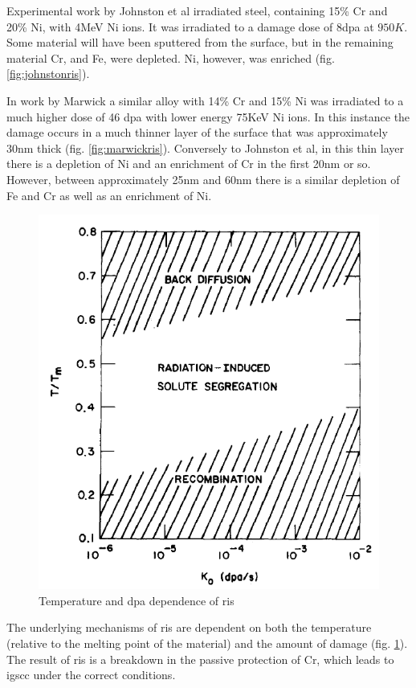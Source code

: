 \FloatBarrier

Experimental work by Johnston et al irradiated steel, containing 15\% Cr and 20\% Ni, with 4MeV Ni ions.  It was irradiated to a damage dose of 8\acrshort{dpa} at $950K$.  Some material will have been sputtered from the surface, but in the remaining material Cr, and Fe, were depleted.  Ni, however, was enriched (fig. \ref{fig:johnstonris}).

In work by Marwick a similar alloy with 14\% Cr and 15\% Ni was irradiated to a much higher dose of 46 \acrshort{dpa} with lower energy 75KeV Ni ions.  In this instance the damage occurs in a much thinner layer of the surface that was approximately 30nm thick (fig. \ref{fig:marwickris}).  Conversely to Johnston et al, in this thin layer there is a depletion of Ni and an enrichment of Cr in the first 20nm or so.  However, between approximately 25nm and 60nm there is a similar depletion of Fe and Cr as well as an enrichment of Ni.


\begin{figure}[h]
  \begin{center}
    \includegraphics[width=.5\linewidth]{chapters/austenitic_steels_in_nuclear/images/okamoto_rehn_temp_ris.png}
    \caption{Temperature and \acrshort{dpa} dependence of \acrshort{ris}\cite{risokamoto}}
    \label{fig:ristemperature}
  \end{center}
\end{figure}

The underlying mechanisms of \acrshort{ris} are dependent on both the temperature (relative to the melting point of the material) and the amount of damage (fig. \ref{fig:ristemperature}).  The result of \acrshort{ris} is a breakdown in the passive protection of Cr, which leads to \acrshort{igscc} under the correct conditions.


\FloatBarrier

